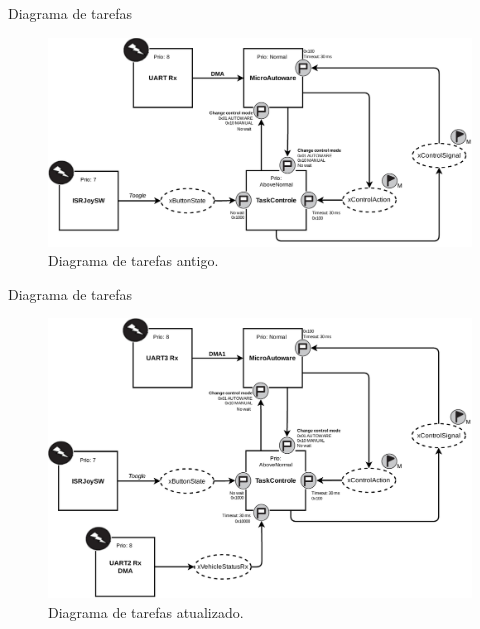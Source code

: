 \documentclass{if-beamer}
\begin{document}
\begin{frame}{Diagrama de tarefas}
	
	\begin{figure}[H]
		\centering
		\includegraphics[width=0.95\linewidth]{system_diagram_old}
		\caption{Diagrama de tarefas antigo.}
		\label{fig:system_diagram_old}
	\end{figure}
	
\end{frame}

\begin{frame}{Diagrama de tarefas}
	
	\begin{figure}[H]
		\centering
		\includegraphics[width=0.75\linewidth]{system_diagram}
		\caption{Diagrama de tarefas atualizado.}
		\label{fig:system_diagram}
	\end{figure}

\end{frame}
\end{document}
